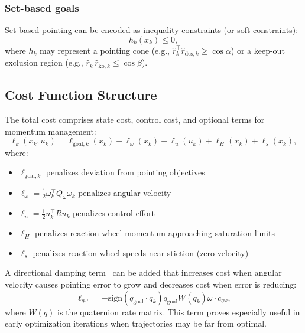 \documentclass[conference]{IEEEtran}
\begin{document}
\subsubsection{Set-based goals}\label{subsubsec:set_goals}
Set-based pointing can be encoded as inequality constraints (or soft constraints):
\begin{equation}\label{eq:set_constraint}
    h_k(x_k) \le 0,
\end{equation}
where $h_k$ may represent a pointing cone (e.g., $\hat{r}_k^\top \hat{r}_{\mathrm{des},k} \ge \cos\alpha$) or a keep-out exclusion region (e.g., $\hat{r}_k^\top \hat{r}_{\mathrm{ko},k} \le \cos\beta$).

\subsection{Cost Function Structure}\label{subsec:cost_structure}

The total cost comprises state cost, control cost, and optional terms for momentum management:
\begin{equation}\label{eq:total_cost}
    \ell_k(x_k, u_k) = \ell_{\text{goal},k}(x_k) + \ell_\omega(x_k) + \ell_u(u_k) + \ell_H(x_k) + \ell_s(x_k),
\end{equation}
where:
\begin{itemize}
    \item $\ell_{\text{goal},k}$ penalizes deviation from pointing objectives
    \item $\ell_\omega = \frac{1}{2}\omega_k^\top Q_\omega \omega_k$ penalizes angular velocity
    \item $\ell_u = \frac{1}{2}u_k^\top R u_k$ penalizes control effort
    \item $\ell_H$ penalizes reaction wheel momentum approaching saturation limits
    \item $\ell_s$ penalizes reaction wheel speeds near stiction (zero velocity)
\end{itemize}

A directional damping term~\cite{gatherer_magnetorquer-only_2019} can be added that increases cost when angular velocity causes pointing error to grow and decreases cost when error is reducing:
\begin{equation}\label{eq:directional_damping}
    \ell_{q\omega} = -\text{sign}(q_{\text{goal}} \cdot q_k) q_{\text{goal}} W(q_k) \omega \cdot c_{q\omega},
\end{equation}
where $W(q)$ is the quaternion rate matrix. This term proves especially useful in early optimization iterations when trajectories may be far from optimal.
\end{document}
